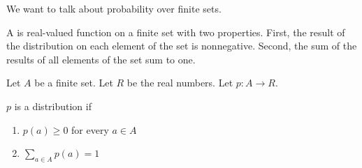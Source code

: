 

We want to talk about
probability over finite
sets.


A 
is real-valued function on a finite
set with two properties. First, the result
of the distribution on each element of the
set is nonnegative.
Second, the sum of the results of all
elements of the set sum to one.


Let $A$ be a finite set.
Let $R$ be the real numbers.
Let $p: A \to R$.

$p$ is a distribution if
\begin{enumerate}
  \item $p(a) \geq 0$ for every $a \in A$
  \item $\sum_{a \in A} p(a) = 1$
\end{enumerate}
